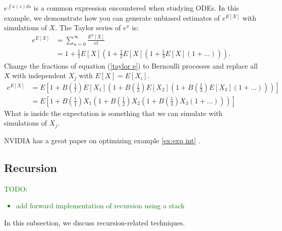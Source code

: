 \documentclass[a4paper,12pt]{article}
\begin{document}
\begin{example}[$e^{E[X]}$] \label{ex:exp int}
    $e^{\int x(s)ds}$ is a common expression encountered when studying ODEs.
    In this example, we demonstrate how you can generate unbiased estimates of
    $e^{E[X]}$ with simulations of $X$. The Taylor series of $e^{x}$ is:
    \begin{align}
        e^{E[X]} & = \sum_{n=0}^{\infty} \frac{E^{n}[X]}{n!}     \\
                 & = 1 + \frac{1}{1}E[X]\left(1+ \frac{1}{2}E[X]
        \left(1+\frac{1}{3}E[X]\left(1+ ...\right)\right)\right). \label{taylor e}
    \end{align}
    Change the fractions of equation (\ref{taylor e}) to Bernoulli processes
    and replace all $X$ with independent $X_j$ with $E[X]=E[X_{i}]$.
    \begin{align}
        e^{E[X]} & = E
        \left[1 + B\left(\frac{1}{1}\right)E[X_1]
        \left(1+ B\left(\frac{1}{2}\right)E[X_2]
        \left(1+B\left(\frac{1}{3}\right)E[X_3]
        \left(1+ ...\right)
        \right)
        \right)
        \right]              \\
                 & = E\left[
            1 + B\left(\frac{1}{1}\right)X_1
            \left(1+ B\left(\frac{1}{2}\right)X_2
            \left(1+B\left(\frac{1}{3}\right)X_3
            \left(1+ ...\right)
            \right)
            \right)
            \right]
    \end{align}
    What is inside the expectation is something that we can simulate with simulations of $X_{j}$.
\end{example}


\begin{related}
    NVIDIA has a great paper on optimizing example \ref{ex:exp int}
    \cite{kettunen_unbiased_2021}.
\end{related}

\subsection{Recursion}
\textcolor{green}{
    TODO:
    \begin{itemize}
        \item add forward implementation of recursion using a stack
    \end{itemize}
}
In this subsection, we discuss recursion-related techniques.
\end{document}
